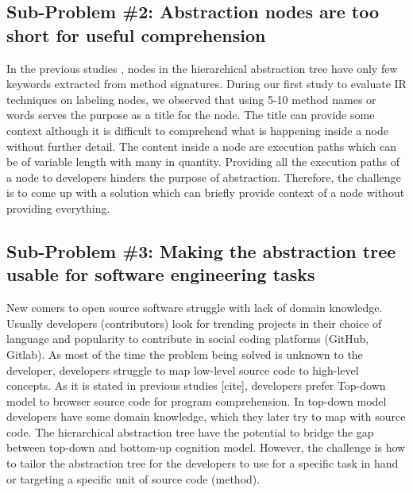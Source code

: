     \subsection{Sub-Problem \#2: Abstraction nodes are too short for useful comprehension}
    In the previous studies \cite{feng2018hierarchicalExecutionComprehension, gharibi2018automaticStaticCluster}, nodes in the hierarchical abstraction tree have only few keywords extracted from method signatures. During our first study to evaluate IR techniques on labeling nodes, we observed that using 5-10 method names or words serves the purpose as a title for the node. The title can provide some context although it is difficult to comprehend what is happening inside a node without further detail. The content inside a node are execution paths which can be of variable length with many in quantity. Providing all the execution paths of a node to developers hinders the purpose of abstraction. Therefore, the challenge is to come up with a solution which can briefly provide context of a node without providing everything. 
    
   

    \subsection{Sub-Problem \#3: Making the abstraction tree usable for software engineering tasks} 
    
    New comers to open source software struggle with lack of domain knowledge. Usually developers (contributors) look for trending projects in their choice of language and popularity to contribute in social coding platforms (GitHub, Gitlab). As most of the time the problem being solved is unknown to the developer, developers struggle to map low-level source code to high-level concepts. As it is stated in previous studies [cite], developers prefer Top-down model to browser source code for program comprehension. In top-down model developers have some domain knowledge, which they later try to map with source code. The hierarchical abstraction tree have the potential to bridge the gap between top-down and bottom-up cognition model. However, the challenge is how to tailor the abstraction tree for the developers to use for a specific task in hand or targeting a specific unit of source code (method). 
    
    
